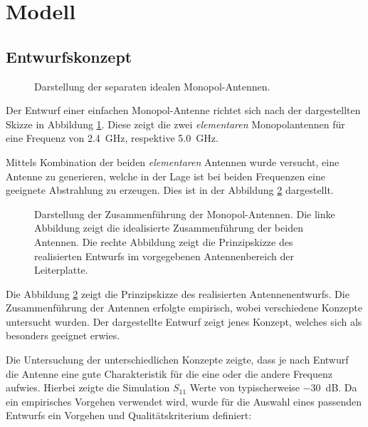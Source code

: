 \section{Modell}

\subsection{Entwurfskonzept}

\begin{figure}[h!]
	\centering
	\def\svgscale{0.75}
	
	\caption{Darstellung der separaten idealen Monopol-Antennen.}
	\label{fig:antenna_concept_1}
\end{figure}

Der Entwurf einer einfachen Monopol-Antenne richtet sich nach der dargestellten
Skizze in Abbildung \ref{fig:antenna_concept_1}. Diese zeigt die zwei
\emph{elementaren} Monopolantennen für eine Frequenz von \SI{2.4}{\giga\hertz},
respektive \SI{5.0}{\giga\hertz}. 
 

Mittels Kombination der beiden \emph{elementaren} Antennen wurde versucht,
eine Antenne zu generieren, welche in der Lage ist bei beiden Frequenzen
eine geeignete Abstrahlung zu erzeugen. Dies ist in der
Abbildung \ref{fig:antenna_concept_2} dargestellt. 

\begin{figure}[h!]
	\centering
	\def\svgscale{0.75}
	
	\caption[Darstellung der Zusammenführung der Monopol-Antennen.]{
		Darstellung der Zusammenführung der Monopol-Antennen.
		Die linke Abbildung zeigt die idealisierte Zusammenführung
		der beiden Antennen. Die rechte Abbildung zeigt die
		Prinzipskizze des realisierten Entwurfs im vorgegebenen
		Antennenbereich der Leiterplatte.}
	\label{fig:antenna_concept_2}
\end{figure}

Die Abbildung \ref{fig:antenna_concept_2} zeigt die Prinzipskizze des
realisierten Antennenentwurfs. Die Zusammenführung der Antennen erfolgte
empirisch, wobei verschiedene Konzepte untersucht wurden. Der dargestellte
Entwurf zeigt jenes Konzept, welches sich als besonders geeignet erwies.

Die Untersuchung der unterschiedlichen Konzepte zeigte, dass je nach
Entwurf die Antenne eine gute Charakteristik für die eine oder die andere
Frequenz aufwies. Hierbei zeigte die Simulation $S_{11}$ Werte von
typischerweise \SI{-30}{\dB}. Da ein empirisches Vorgehen verwendet
wird, wurde für die Auswahl eines passenden Entwurfs ein Vorgehen und
Qualitätskriterium definiert:

